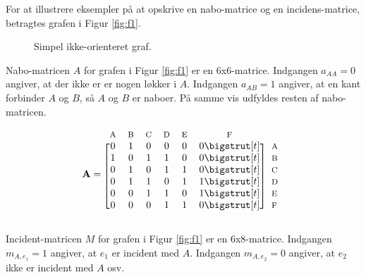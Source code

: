 \begin{exmp}
	For at illustrere eksempler på at opskrive en nabo-matrice og en incidens-matrice, betragtes grafen i Figur \ref{fig:f1}. 
	
	\begin{figure}[h!]
		\centering
		
		\caption{Simpel ikke-orienteret graf.} \label{fig:simple_graph_labels}
	\end{figure}
	
	Nabo-matricen $A$ for grafen i Figur \ref{fig:f1} er en $6$x$6$-matrice.
	Indgangen $a_{AA}=0$ angiver, at der ikke er er nogen løkker i $A$.
	Indgangen $a_{AB}=1$ angiver, at en kant forbinder $A$ og $B$, så $A$ og $B$ er naboer.
	På samme vis udfyldes resten af nabo-matricen. 
	
	 \begin{equation*}
	  \mathbf{A}=
	  \begin{blockarray}{*{6}{c} l}
	    \begin{block}{*{6}{>{$\footnotesize}c<{$}} l}
	      A & B & C & D & E & F \\
	    \end{block}
	    \begin{block}{[*{6}{c}]>{$\footnotesize}l<{$}}
	      0 & 1 & 0 & 0 & 0 & 0 \bigstrut[t]& A \\
	      1 & 0 & 1 & 1 & 0 & 0 \bigstrut[t]&B \\
	      0 & 1 & 0 & 1 & 1 & 0 \bigstrut[t]&C \\
	      0 & 1 & 1 & 0 & 1 & 1 \bigstrut[t]& D \\
	      0 & 0 & 1 & 1 & 0 & 1 \bigstrut[t]& E \\
	      0 & 0 & 0 & 1 & 1 & 0 \bigstrut[t]& F \\
	    \end{block}
	  \end{blockarray}
	\end{equation*} 
	
	Incident-matricen $M$ for grafen i Figur \ref{fig:f1} er en $6$x$8$-matrice.
	Indgangen $m_{A,e_1}=1$ angiver, at $e_1$ er incident med $A$.
	Indgangen $m_{A,e_2}=0$ angiver, at $e_2$ ikke er incident med $A$ osv.
	

\end{exmp}
